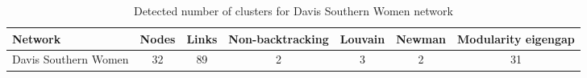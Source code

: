 \begin{table}
\caption{Detected number of clusters for Davis Southern Women network}
\label{tab:clustering_comparison}
\begin{tabular}{l|c|c|c|c|c|c}
\toprule
Network & Nodes & Links & Non-backtracking & Louvain & Newman & Modularity eigengap \\
\midrule
Davis Southern Women & 32 & 89 & 2 & 3 & 2 & 31 \\
\bottomrule
\end{tabular}
\end{table}
